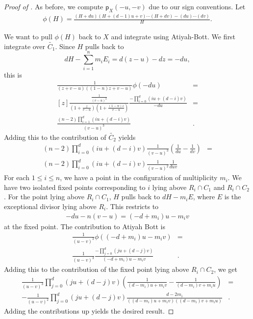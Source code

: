 \documentclass[12 pt, reqno]{amsart}
\theoremstyle{definition}
\newcommand{\wt}{\widetilde}
\newcommand{\p}{\mathsf{p}}
\begin{document}
\begin{proof}[Proof of ]
As before, we compute $\p_X(-u,-v)$ due to our sign conventions. Let
\begin{align*}
\phi(H) = \frac{(H+du)(H+(d-1)u+v)\cdots (H+dv)-(du)\cdots (dv)}{H}.
\end{align*}

We want to pull $\phi(H)$ back to $X$ and integrate using
Atiyah-Bott. We first integrate over $\wt{C_1}$. Since $H$ pulls back
to
$$dH-\sum_{i=1}^{n}{m_iE_i}=d(z-u)-dz=-du,$$
 this is
\begin{align*}
[z]\frac{1}{(z+v-u)((1-n)z+v-u)}\phi(-du)&=\\
[z]\frac{\frac{1}{(v-u)^2}}{(1+\frac{z}{v-u})(1+\frac{(1-n)z}{v-u})}\frac{-\prod_{i=0}^{d}{(iu+(d-i)v)}}{-du}&=\\
\frac{(n-2)\prod_{i=1}^{d}{(iu+(d-i)v)}}{(v-u)^3}&. 
\end{align*}
Adding this to the contribution of $\wt{C_2}$ yields
\begin{align*}
(n-2)\prod_{i=0}^{d}{(iu+(d-i)v)}\frac{1}{(v-u)^3}\left(\frac{1}{du}-\frac{1}{dv}\right)&=\\
(n-2)\prod_{i=0}^{d}{(iu+(d-i)v)}\frac{1}{(v-u)^2}\frac{1}{duv}
\end{align*}
For each $1\leq i\leq n$, we have a point in the configuration of
multiplicity $m_i$. We have two isolated fixed points corresponding to
$i$ lying above $R_i\cap C_1$ and $R_i\cap C_2$. For the point lying
above $R_i\cap C_1$, $H$ pulls back to $dH-m_iE$, where $E$ is the
exceptional divisor lying above $R_i$. This restricts to
\begin{align*}
-du-n(v-u)=(-d+m_i)u-m_iv
\end{align*}
at the fixed point. The contribution to Atiyah Bott is
\begin{align*}
\frac{1}{(u-v)^3}\phi((-d+m_i)u-m_iv)&=\\
\frac{1}{(u-v)^3}\frac{-\prod_{j=0}^{d}{(ju+(d-j)v)}}{(-d+m_i)u-m_iv}&.
\end{align*}
Adding this to the contribution of the fixed point lying above
$R_i\cap C_2$, we get
\begin{align*}
  \frac{1}{(u-v)^3}\prod_{j=0}^{d}{(ju+(d-j)v)}\left(\frac{1}{(d-m_i)u+m_iv}-\frac{1}{(d-m_i)v+m_iu}\right)&=\\
-\frac{1}{(u-v)^2}\prod_{j=0}^{d}{(ju+(d-j)v)}\frac{d-2m_i}{((d-m_i)u+m_iv)((d-m_i)v+m_iu)}&.
\end{align*}
Adding the contributions up yields the desired result.
\end{proof}
\end{document}
